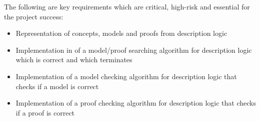 The following are key requirements which are critical, high-risk and essential for the project success:

\begin{itemize}
\item Representation of concepts, models and proofs from description logic 
\item Implementation in of a model/proof searching algorithm for description logic which is correct and which terminates
\item Implementation of a model checking algorithm for description logic that checks
if a model is correct
\item Implementation of a proof checking algorithm for description logic that checks if a proof is correct
\end{itemize}

